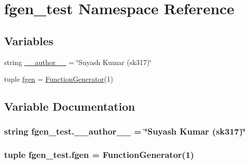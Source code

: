 \hypertarget{namespacefgen__test}{}\section{fgen\+\_\+test Namespace Reference}
\label{namespacefgen__test}
\subsection*{Variables}
\begin{DoxyCompactItemize}
\item 
string \hyperlink{namespacefgen__test_af3d4f9d7a79e729296db656ed5ac9104}{\+\_\+\+\_\+author\+\_\+\+\_\+} = \char`\"{}Suyash Kumar (sk317)\char`\"{}
\item 
tuple \hyperlink{namespacefgen__test_a83ac0a5d754be6a65995d94e09629c7d}{fgen} = \hyperlink{class_function_generator_1_1_function_generator}{Function\+Generator}(1)
\end{DoxyCompactItemize}


\subsection{Variable Documentation}
\hypertarget{namespacefgen__test_af3d4f9d7a79e729296db656ed5ac9104}{}
\subsubsection[{\+\_\+\+\_\+author\+\_\+\+\_\+}]{\setlength{\rightskip}{0pt plus 5cm}string fgen\+\_\+test.\+\_\+\+\_\+author\+\_\+\+\_\+ = \char`\"{}Suyash Kumar (sk317)\char`\"{}}\label{namespacefgen__test_af3d4f9d7a79e729296db656ed5ac9104}
\hypertarget{namespacefgen__test_a83ac0a5d754be6a65995d94e09629c7d}{}
\subsubsection[{fgen}]{\setlength{\rightskip}{0pt plus 5cm}tuple fgen\+\_\+test.\+fgen = {\bf Function\+Generator}(1)}\label{namespacefgen__test_a83ac0a5d754be6a65995d94e09629c7d}
